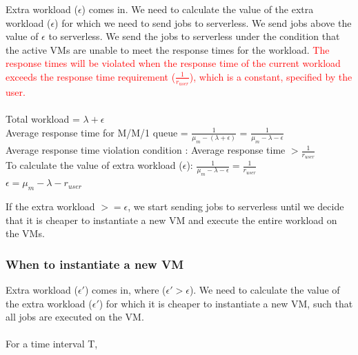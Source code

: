 \documentclass[letter,11pt]{article}
\newcommand{\red}[1]{\textcolor{red}{#1}}
\begin{document}
Extra workload ($\epsilon$) comes in. We need to calculate the value of the extra workload ($\epsilon$) for which we need to send jobs to serverless. We send jobs above the value of $\epsilon$ to serverless. We send the jobs to serverless under the condition that the active VMs are unable to meet the response times for the workload. \red{The response times will be violated when the response time of the current workload exceeds the response time requirement ($\frac{1}{r_{user}}$), which is a constant, specified by the user.} \\ \\
Total workload = $\lambda + \epsilon$ \\
Average response time for M/M/1 queue = $\frac{1}{\mu_m - (\lambda + \epsilon)}$ = $\frac{1}{\mu_m - \lambda - \epsilon}$ \\
Average response time violation condition : Average response time $> \frac{1}{r_{user}}$  \\
To calculate the value of extra workload ($\epsilon$):
 $\frac{1}{\mu_m - \lambda - \epsilon} = \frac{1}{r_{user}}$ \\
$\epsilon = \mu_m - \lambda - r_{user}$

If the extra workload $>= \epsilon$, we start sending jobs to serverless until we decide that it is cheaper to instantiate a new VM and execute the entire workload on the VMs.
 

\subsubsection{When to instantiate a new VM} 

Extra workload ($\epsilon'$) comes in, where  ($\epsilon' > \epsilon$). We need to calculate the value of the extra workload ($\epsilon'$) for which it is cheaper to instantiate a new VM, such that all jobs are executed on the VM. \\ \\ 
For a time interval T, 
\end{document}
